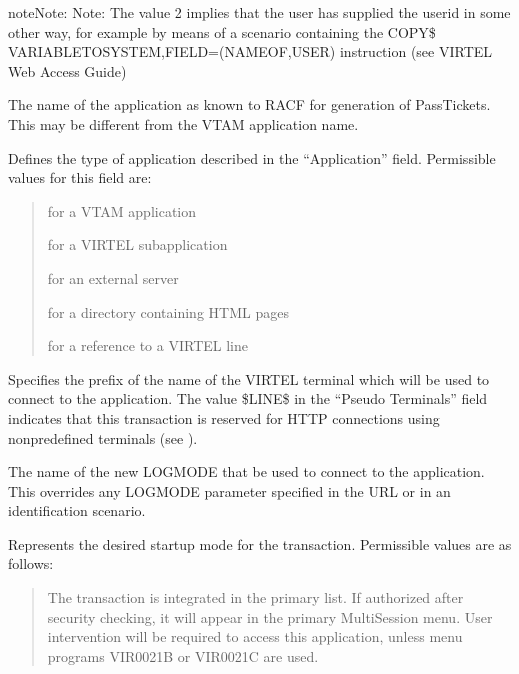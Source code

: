\documentclass[letterpaper,10pt,english]{sphinxmanual}
\begin{document}
\begin{sphinxadmonition}{note}{Note:}
\sphinxAtStartPar
Note: The value 2 implies that the user has supplied the userid in some other way, for example by means of a scenario containing the COPY\$ VARIABLE\sphinxhyphen{}TO\sphinxhyphen{}SYSTEM,FIELD=(NAME\sphinxhyphen{}OF,USER) instruction (see VIRTEL Web Access Guide)
\end{sphinxadmonition}
\begin{description}
\sphinxAtStartPar
The name of the application as known to RACF for generation of PassTickets. This may be different from the VTAM application name.

\sphinxAtStartPar
Defines the type of application described in the “Application” field. Permissible values for this field are:
\begin{quote}
\begin{description}
\sphinxAtStartPar
for a VTAM application

\sphinxAtStartPar
for a VIRTEL sub\sphinxhyphen{}application

\sphinxAtStartPar
for an external server

\sphinxAtStartPar
for a directory containing HTML pages

\sphinxAtStartPar
for a reference to a VIRTEL line

\end{description}
\end{quote}

\sphinxAtStartPar
Specifies the prefix of the name of the VIRTEL terminal which will be used to connect to the application. The value \$LINE\$ in the “Pseudo Terminals” field indicates that this transaction is reserved for HTTP connections using non\sphinxhyphen{}predefined terminals (see {\hyperref[\detokenize{connectivity_guide:v462cn-forceluname}]{}}).

\sphinxAtStartPar
The name of the new LOGMODE that  be used to connect to the application. This overrides any LOGMODE parameter specified in the URL or in an identification scenario.

\sphinxAtStartPar
Represents the desired startup mode for the transaction. Permissible values are as follows:
\begin{quote}
\begin{description}
\sphinxAtStartPar
The transaction is integrated in the primary list. If authorized after security checking, it will appear in the primary Multi\sphinxhyphen{}Session menu. User intervention will be required to access this application, unless menu programs VIR0021B or VIR0021C are used.


\end{description}
\end{quote}
\end{description}
\end{document}
